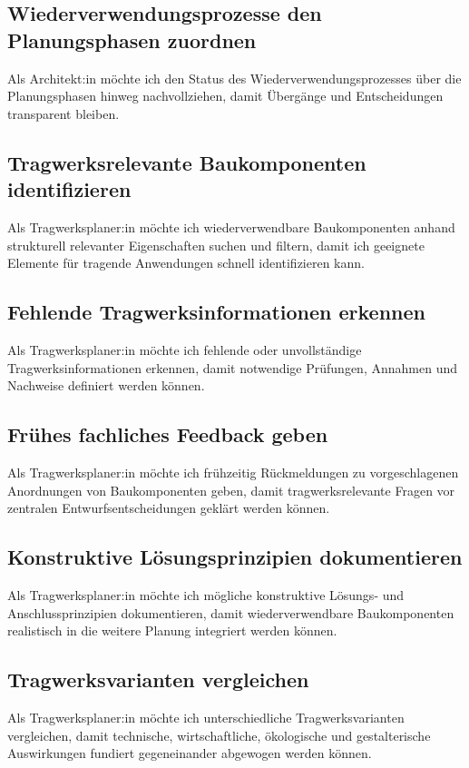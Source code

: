 \subsection{Wiederverwendungsprozesse den Planungsphasen zuordnen}
\label{us:a-12} Als Architekt:in möchte ich den Status des Wiederverwendungsprozesses über die Planungsphasen hinweg nachvollziehen, damit Übergänge und Entscheidungen transparent bleiben.


\subsection{Tragwerksrelevante Baukomponenten identifizieren}
\label{us:t-01} Als Tragwerksplaner:in möchte ich wiederverwendbare Baukomponenten anhand strukturell relevanter Eigenschaften suchen und filtern, damit ich geeignete Elemente für tragende Anwendungen schnell identifizieren kann.

\subsection{Fehlende Tragwerksinformationen erkennen}
\label{us:t-02} Als Tragwerksplaner:in möchte ich fehlende oder unvollständige Tragwerksinformationen erkennen, damit notwendige Prüfungen, Annahmen und Nachweise definiert werden können.

\subsection{Frühes fachliches Feedback geben}
\label{us:t-03} Als Tragwerksplaner:in möchte ich frühzeitig Rückmeldungen zu vorgeschlagenen Anordnungen von Baukomponenten geben, damit tragwerksrelevante Fragen vor zentralen Entwurfsentscheidungen geklärt werden können.

\subsection{Konstruktive Lösungsprinzipien dokumentieren}
\label{us:t-04} Als Tragwerksplaner:in möchte ich mögliche konstruktive Lösungs- und Anschlussprinzipien dokumentieren, damit wiederverwendbare Baukomponenten realistisch in die weitere Planung integriert werden können.

\subsection{Tragwerksvarianten vergleichen}
\label{us:t-05} Als Tragwerksplaner:in möchte ich unterschiedliche Tragwerksvarianten vergleichen, damit technische, wirtschaftliche, ökologische und gestalterische Auswirkungen fundiert gegeneinander abgewogen werden können.

